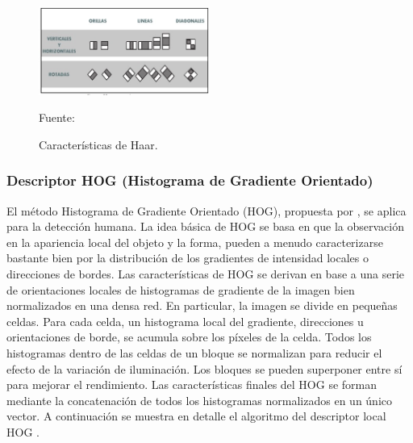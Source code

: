 \begin{figure}[ht]
\begin{center}
\includegraphics[width=0.5\textwidth]{Imagen18}
\end{center}
\begin{center}
\vskip -0.5cm
\caption{\small{Características de Haar.}}
{\small{Fuente: \cite{Lopez}}}
\end{center}
\end{figure}

\subsubsection{Descriptor HOG (Histograma de Gradiente Orientado)}
El método Histograma de Gradiente Orientado (HOG), propuesta por , se aplica para la detección humana. La idea básica de HOG se basa en que la observación en la apariencia local del objeto y la forma, pueden a menudo caracterizarse bastante bien por la distribución de los gradientes de intensidad locales o direcciones de bordes. Las características de HOG se derivan en base a una serie de orientaciones locales de histogramas de gradiente de la imagen bien normalizados en una densa red. En particular, la imagen se divide en pequeñas celdas. Para cada celda, un histograma local del gradiente, direcciones u orientaciones de borde, se acumula sobre los píxeles de la celda. Todos los histogramas dentro de las celdas de un bloque se normalizan para reducir el efecto de la variación de iluminación. Los bloques se pueden superponer entre sí para mejorar el rendimiento. Las características finales del HOG se forman mediante la concatenación de todos los histogramas normalizados en un único vector. A continuación se muestra en detalle el algoritmo del descriptor local HOG \citep{Aguilar}.

